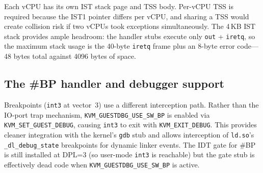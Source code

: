 Each vCPU has its own IST stack page and TSS body.  Per-vCPU TSS is
required because the IST1 pointer differs per vCPU, and sharing a TSS
would create collision risk if two vCPUs took exceptions simultaneously.
The 4\,KB IST stack provides ample headroom: the handler stubs execute only
\texttt{out} + \texttt{iretq}, so the maximum stack usage is the 40-byte
\texttt{iretq} frame plus an 8-byte error code---48 bytes total against
4096 bytes of space.

\subsection{The \#BP handler and debugger support}

Breakpoints (\texttt{int3} at vector~3) use a different interception path.
Rather than the IO-port trap mechanism, \texttt{KVM\_GUESTDBG\_USE\_SW\_BP}
is enabled via \texttt{KVM\_SET\_GUEST\_DEBUG}, causing \texttt{int3} to
exit with \texttt{KVM\_EXIT\_DEBUG}.  This provides cleaner integration
with the \UML{} kernel's \texttt{gdb} stub and allows interception of
\texttt{ld.so}'s \texttt{\_dl\_debug\_state} breakpoints for dynamic linker
events.  The IDT gate for \#BP is still installed at DPL=3 (so user-mode
\texttt{int3} is reachable) but the gate stub is effectively dead code
when \texttt{KVM\_GUESTDBG\_USE\_SW\_BP} is active.


